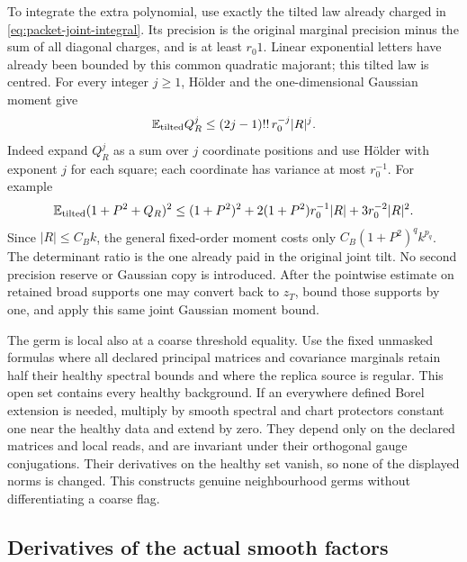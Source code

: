 \documentclass[11pt,reqno]{amsart}
\numberwithin{equation}{section}
\theoremstyle{definition}
\theoremstyle{remark}
\begin{document}
To integrate the extra polynomial, use exactly the tilted law
already charged in \eqref{eq:packet-joint-integral}. Its
precision is the original marginal precision minus the sum of
all diagonal charges, and is at least \(r_0 1\). Linear
exponential letters have already been bounded by this common
quadratic majorant; this tilted law is centred. For every
integer \(j\ge1\), H\"older and the one-dimensional Gaussian
moment give
\begin{equation}
 \mathbb E_{\rm tilted}Q_R^j
                    \le(2j-1)!!\,r_0^{-j}|R|^j.
 \label{eq:output-mixed-score-moments}
\end{equation}
Indeed expand \(Q_R^j\) as a sum over \(j\) coordinate
positions and use H\"older with exponent \(j\) for each
square; each coordinate has variance at most \(r_0^{-1}\).
For example
\[
 \mathbb E_{\rm tilted}(1+P^2+Q_R)^2
   \le(1+P^2)^2+2(1+P^2)r_0^{-1}|R|+3r_0^{-2}|R|^2.
\]
Since \(|R|\le C_Bk\), the general fixed-order moment costs
only \(C_B(1+P^2)^q k^{p_q}\). The determinant ratio is
the one already paid in the original joint tilt. No second
precision reserve or Gaussian copy is introduced. After the
pointwise estimate on retained broad supports one may convert
back to \(z_T\), bound those supports by one, and apply this
same joint Gaussian moment bound.

The germ is local also at a coarse threshold equality. Use
the fixed unmasked formulas where all declared principal
matrices and covariance marginals retain half their healthy
spectral bounds and where the replica source is regular.
This open set contains every healthy background. If an
everywhere defined Borel extension is needed, multiply by
smooth spectral and chart protectors constant one near the
healthy data and extend by zero. They depend only on the
declared matrices and local reads, and are invariant under
their orthogonal gauge conjugations. Their derivatives on
the healthy set vanish, so none of the displayed norms is
changed. This constructs genuine neighbourhood germs without
differentiating a coarse flag.


\subsection{Derivatives of the actual smooth factors}
\end{document}
